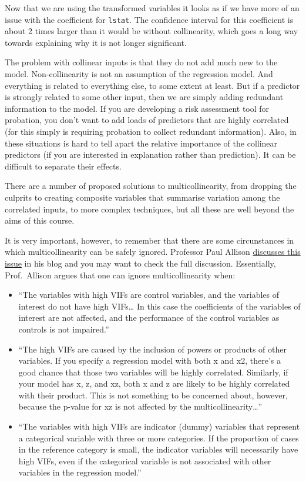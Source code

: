 \documentclass[
]{book}
\begin{document}
Now that we are using the transformed variables it looks as if we have more of an issue with the coefficient for \texttt{lstat}. The confidence interval for this coefficient is about 2 times larger than it would be without collinearity, which goes a long way towards explaining why it is not longer significant.

The problem with collinear inputs is that they do not add much new to the model. Non-collinearity is not an assumption of the regression model. And everything is related to everything else, to some extent at least. But if a predictor is strongly related to some other input, then we are simply adding redundant information to the model. If you are developing a risk assessment tool for probation, you don't want to add loads of predictors that are highly correlated (for this simply is requiring probation to collect redundant information). Also, in these situations is hard to tell apart the relative importance of the collinear predictors (if you are interested in explanation rather than prediction). It can be difficult to separate their effects.

There are a number of proposed solutions to multicollinearity, from dropping the culprits to creating composite variables that summarise variation among the correlated inputs, to more complex techniques, but all these are well beyond the aims of this course.

It is very important, however, to remember that there are some circunstances in which multicollinearity can be safely ignored. Professor Paul Allison \href{http://www.statisticalhorizons.com/multicollinearity}{discusses this issue} in his blog and you may want to check the full discussion. Essentially, Prof.~Allison argues that one can ignore multicollinearity when:

\begin{itemize}
\item
  ``The variables with high VIFs are control variables, and the variables of interest do not have high VIFs\ldots{} In this case the coefficients of the variables of interest are not affected, and the performance of the control variables as controls is not impaired.''
\item
  ``The high VIFs are caused by the inclusion of powers or products of other variables. If you specify a regression model with both x and x2, there's a good chance that those two variables will be highly correlated. Similarly, if your model has x, z, and xz, both x and z are likely to be highly correlated with their product. This is not something to be concerned about, however, because the p-value for xz is not affected by the multicollinearity\ldots{}''
\item
  ``The variables with high VIFs are indicator (dummy) variables that represent a categorical variable with three or more categories. If the proportion of cases in the reference category is small, the indicator variables will necessarily have high VIFs, even if the categorical variable is not associated with other variables in the regression model.''
\end{itemize}
\end{document}
